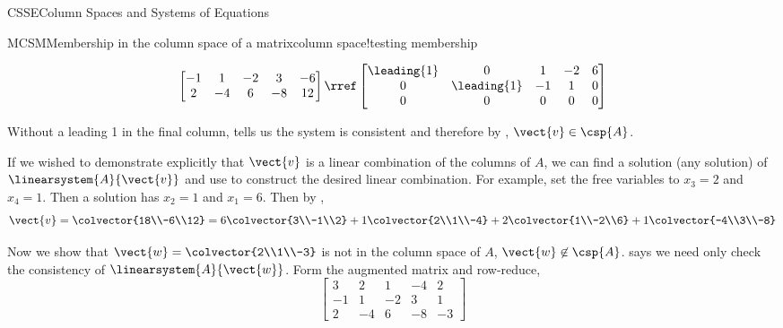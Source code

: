 \begin{subsect}{CSSE}{Column Spaces and Systems of Equations}
\begin{example}{MCSM}{Membership in the column space of a matrix}{column space!testing membership}
\begin{para}
\begin{equation*}
\begin{bmatrix}
-1 & 1 & -2 & 3 & -6\\
2 & -4 & 6 & -8 & 12
\end{bmatrix}
%
\rref
%
\begin{bmatrix}
\leading{1} & 0 & 1 & -2 & 6\\
0 & \leading{1} & -1 & 1 & 0\\
0 & 0 & 0 & 0 & 0
\end{bmatrix}
\end{equation*}
\end{para}
%
\begin{para}Without a leading 1 in the final column,  tells us the system is consistent and therefore by , $\vect{v}\in\csp{A}$.\end{para}
%
\begin{para}If we wished to demonstrate explicitly that $\vect{v}$ is a linear combination of the columns of $A$, we can find a solution (any solution) of $\linearsystem{A}{\vect{v}}$ and use  to construct the desired linear combination.  For example, set the free variables to $x_3=2$ and $x_4=1$.  Then a solution has $x_2=1$ and $x_1=6$.  Then by ,
%
\begin{equation*}
\vect{v}=\colvector{18\\-6\\12}=
6\colvector{3\\-1\\2}+
1\colvector{2\\1\\-4}+
2\colvector{1\\-2\\6}+
1\colvector{-4\\3\\-8}
\end{equation*}
\end{para}
%
\begin{para}Now we show that $\vect{w}=\colvector{2\\1\\-3}$ is not in the column space of $A$, $\vect{w}\not\in\csp{A}$.   says we need only check the consistency of $\linearsystem{A}{\vect{w}}$.  Form the augmented matrix and row-reduce,
%
\begin{equation*}
\begin{bmatrix}
3 & 2 & 1 & -4 & 2\\
-1 & 1 & -2 & 3 & 1\\
2 & -4 & 6 & -8 & -3
\end{bmatrix}

\end{equation*}
\end{para}
\end{example}
\end{subsect}
